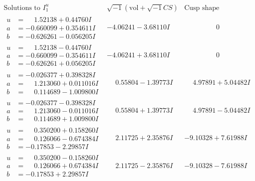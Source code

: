 \documentclass[1p]{elsarticle_modified}
\theoremstyle{definition}
\newcommand{\I}{\sqrt{-1}}
\begin{document}
$$\begin{array}{c|c|c}
 \end{array}$$\newpage$$\begin{array}{c|c|c}  
\text{Solutions to }I^u_{1}& \I (\text{vol} + \sqrt{-1}CS) & \text{Cusp shape}\\
 \hline 
\begin{aligned}
u &= \phantom{-}1.52138 + 0.44760 I \\
a &= -0.660099 + 0.354611 I \\
b &= -0.626261 - 0.056205 I\end{aligned}
 & -4.06241 - 3.68110 I & \phantom{-0.000000 } 0 \\ \hline\begin{aligned}
u &= \phantom{-}1.52138 - 0.44760 I \\
a &= -0.660099 - 0.354611 I \\
b &= -0.626261 + 0.056205 I\end{aligned}
 & -4.06241 + 3.68110 I & \phantom{-0.000000 } 0 \\ \hline\begin{aligned}
u &= -0.026377 + 0.398328 I \\
a &= \phantom{-}1.213060 + 0.011016 I \\
b &= \phantom{-}0.114689 - 1.009800 I\end{aligned}
 & \phantom{-}0.55804 - 1.39773 I & \phantom{-}4.97891 + 5.04482 I \\ \hline\begin{aligned}
u &= -0.026377 - 0.398328 I \\
a &= \phantom{-}1.213060 - 0.011016 I \\
b &= \phantom{-}0.114689 + 1.009800 I\end{aligned}
 & \phantom{-}0.55804 + 1.39773 I & \phantom{-}4.97891 - 5.04482 I \\ \hline\begin{aligned}
u &= \phantom{-}0.350200 + 0.158260 I \\
a &= \phantom{-}0.126066 - 0.674384 I \\
b &= -0.17853 - 2.29857 I\end{aligned}
 & \phantom{-}2.11725 + 2.35876 I & -9.10328 + 7.61988 I \\ \hline\begin{aligned}
u &= \phantom{-}0.350200 - 0.158260 I \\
a &= \phantom{-}0.126066 + 0.674384 I \\
b &= -0.17853 + 2.29857 I\end{aligned}
 & \phantom{-}2.11725 - 2.35876 I & -9.10328 - 7.61988 I \\ \hline\begin{aligned}

\end{aligned}
\end{array}$$
\end{document}

